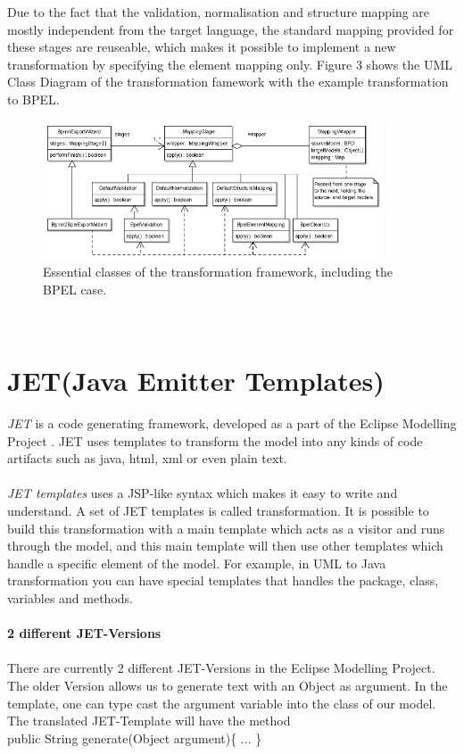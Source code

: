 Due to the fact that the validation, normalisation and structure mapping are mostly independent from the target language, the standard mapping provided for these stages are reuseable, which makes it possible to implement a new transformation by specifying the element mapping only. Figure 3 shows the UML Class Diagram of the transformation famework with the example transformation to BPEL.
\begin{figure}[h]
	\centering
		\includegraphics[width=0.90\textwidth]{images/transformation.png}
	\caption{Essential classes of the transformation framework, including the BPEL case.\cite{3}}
	\label{fig:transform}
\end{figure}\\


\section{JET(Java Emitter Templates)}
\textit{JET}\cite{13} is a code generating framework, developed as a part of the Eclipse Modelling Project \cite{14}. JET uses templates to transform the model into any kinds of code artifacts such as java, html, xml or even plain text. \\\\
\textit{JET templates} uses a JSP-like syntax which makes it easy to write and understand. A set of JET templates is called transformation. It is possible to build this transformation with a main template which acts as a visitor and runs through the model, and this main template will then use other templates which handle a specific element of the model. For example, in UML to Java transformation you can have special templates that handles the package, class, variables and methods.\\\\

\textbf{2 different JET-Versions}\\\\
There are currently 2 different JET-Versions in the Eclipse Modelling Project. The older Version allows us to generate text with an Object as argument. In the template, one can type cast the argument variable into the class of our model. \\
The translated JET-Template will have the method \\
public String generate(Object argument)\{
...
\}

